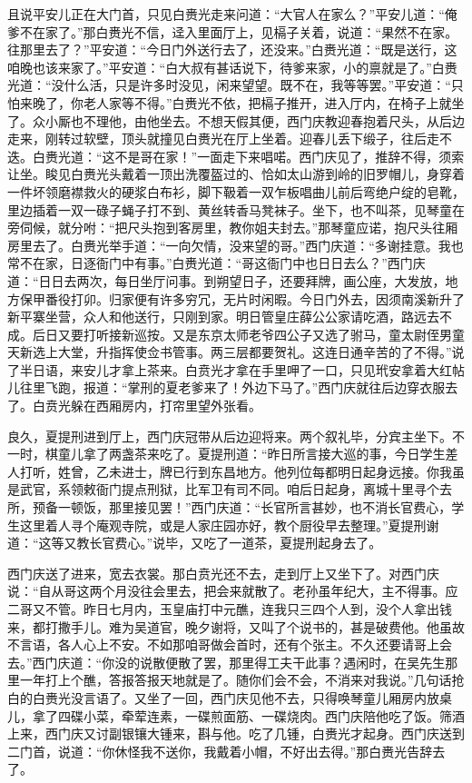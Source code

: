 且说平安儿正在大门首，只见白赉光走来问道：“大官人在家么？”平安儿道：“俺爹不在家了。”那白赉光不信，迳入里面厅上，见槅子关着，说道：“果然不在家。往那里去了？”平安道：“今日门外送行去了，还没来。”白赉光道：“既是送行，这咱晚也该来家了。”平安道：“白大叔有甚话说下，待爹来家，小的禀就是了。”白赉光道：“没什么活，只是许多时没见，闲来望望。既不在，我等等罢。”平安道：“只怕来晚了，你老人家等不得。”白赉光不依，把槅子推开，进入厅内，在椅子上就坐了。众小厮也不理他，由他坐去。不想天假其便，西门庆教迎春抱着尺头，从后边走来，刚转过软壁，顶头就撞见白赉光在厅上坐着。迎春儿丢下缎子，往后走不迭。白赉光道：“这不是哥在家！”一面走下来唱喏。西门庆见了，推辞不得，须索让坐。睃见白赉光头戴着一顶出洗覆盔过的、恰如太山游到岭的旧罗帽儿，身穿着一件坏领磨襟救火的硬浆白布衫，脚下靸着一双乍板唱曲儿前后弯绝户绽的皂靴，里边插着一双一碌子蝇子打不到、黄丝转香马凳袜子。坐下，也不叫茶，见琴童在旁伺候，就分咐：“把尺头抱到客房里，教你姐夫封去。”那琴童应诺，抱尺头往厢房里去了。白赉光举手道：“一向欠情，没来望的哥。”西门庆道：“多谢挂意。我也常不在家，日逐衙门中有事。”白赉光道：“哥这衙门中也日日去么？”西门庆道：“日日去两次，每日坐厅问事。到朔望日子，还要拜牌，画公座，大发放，地方保甲番役打卯。归家便有许多穷冗，无片时闲暇。今日门外去，因须南溪新升了新平寨坐营，众人和他送行，只刚到家。明日管皇庄薛公公家请吃酒，路远去不成。后日又要打听接新巡按。又是东京太师老爷四公子又选了驸马，童太尉侄男童天新选上大堂，升指挥使佥书管事。两三层都要贺礼。这连日通辛苦的了不得。”说了半日语，来安儿才拿上茶来。白贲光才拿在手里呷了一口，只见玳安拿着大红帖儿往里飞跑，报道：“掌刑的夏老爹来了！外边下马了。”西门庆就往后边穿衣服去了。白贲光躲在西厢房内，打帘里望外张看。

良久，夏提刑进到厅上，西门庆冠带从后边迎将来。两个叙礼毕，分宾主坐下。不一时，棋童儿拿了两盏茶来吃了。夏提刑道：“昨日所言接大巡的事，今日学生差人打听，姓曾，乙未进士，牌已行到东昌地方。他列位每都明日起身远接。你我虽是武官，系领敕衙门提点刑狱，比军卫有司不同。咱后日起身，离城十里寻个去所，预备一顿饭，那里接见罢！”西门庆道：“长官所言甚妙，也不消长官费心，学生这里着人寻个庵观寺院，或是人家庄园亦好，教个厨役早去整理。”夏提刑谢道：“这等又教长官费心。”说毕，又吃了一道茶，夏提刑起身去了。

西门庆送了进来，宽去衣裳。那白贲光还不去，走到厅上又坐下了。对西门庆说：“自从哥这两个月没往会里去，把会来就散了。老孙虽年纪大，主不得事。应二哥又不管。昨日七月内，玉皇庙打中元醮，连我只三四个人到，没个人拿出钱来，都打撒手儿。难为吴道官，晚夕谢将，又叫了个说书的，甚是破费他。他虽故不言语，各人心上不安。不如那咱哥做会首时，还有个张主。不久还要请哥上会去。”西门庆道：“你没的说散便散了罢，那里得工夫干此事？遇闲时，在吴先生那里一年打上个醮，答报答报天地就是了。随你们会不会，不消来对我说。”几句话抢白的白赉光没言语了。又坐了一回，西门庆见他不去，只得唤琴童儿厢房内放桌儿，拿了四碟小菜，牵荤连素，一碟煎面筋、一碟烧肉。西门庆陪他吃了饭。筛酒上来，西门庆又讨副银镶大锺来，斟与他。吃了几锺，白赉光才起身。西门庆送到二门首，说道：“你休怪我不送你，我戴着小帽，不好出去得。”那白赉光告辞去了。

